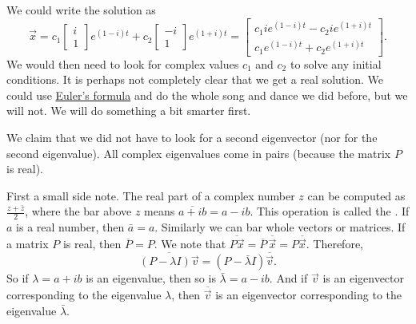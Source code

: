 \documentclass[12pt]{book}
\begin{document}
We could write the solution as
\begin{equation*}
\vec{x} =
c_1 \begin{bmatrix} i \\ 1 \end{bmatrix} e^{(1-i)t} +
c_2 \begin{bmatrix} -i \\ 1 \end{bmatrix} e^{(1+i)t}
=
\begin{bmatrix}
c_1 i e^{(1-i)t} - c_2 i e^{(1+i)t} \\
c_1 e^{(1-i)t} + c_2 e^{(1+i)t}
\end{bmatrix} .
\end{equation*}
We would then need to look for complex values $c_1$ and $c_2$ to solve
any initial conditions.  It is perhaps not completely clear
that we get a real solution.  We could use
\hyperref[eulersformula]{Euler's formula} and do the
whole song and dance we did before, but we will not.   We will do something
a bit smarter first.

\medskip

We claim that we did not have to look for a second eigenvector
(nor for the second eigenvalue).  All complex eigenvalues come in pairs
(because the matrix $P$ is real).

First a small side note.  The real part of
a complex number $z$ can be computed as $\frac{z + \bar{z}}{2}$, where
the bar above $z$ means $\overline{a+ib} = a -ib$.  This operation is called the
\emph{}.
If $a$ is a real number, then $\bar{a} = a$.
Similarly
we can bar whole vectors or matrices.  If a matrix $P$ is real, then
$\overline{P} = P$.  We note that $\overline{P\vec{x}} = \overline{P} \,
\overline{\vec{x}} = P \overline{\vec{x}}$.
Therefore,
\begin{equation*}
\overline{(P-\lambda I)\vec{v}}
=
(P-\bar{\lambda} I)\overline{\vec{v}} .
\end{equation*}
So if $\lambda = a+ib$ is an eigenvalue, then so is $\bar{\lambda} = a-ib$.
And if $\vec{v}$ is an eigenvector corresponding to the eigenvalue
$\lambda$, then $\overline{\vec{v}}$ is an eigenvector corresponding
to the eigenvalue $\bar{\lambda}$.  
\end{document}
